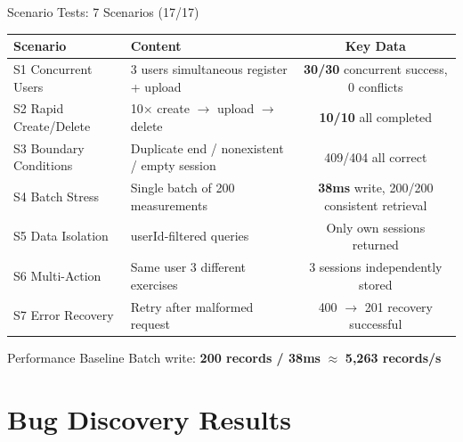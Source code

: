 \documentclass[aspectratio=169,utf8,11pt]{beamer}
\begin{document}
\begin{frame}{Scenario Tests: 7 Scenarios (17/17)}
  \begin{table}[h]
    \centering
    \footnotesize
    \begin{tabular}{llc}
      \toprule
      \textbf{Scenario} & \textbf{Content} & \textbf{Key Data} \\
      \midrule
      S1 Concurrent Users & 3 users simultaneous register + upload & \textbf{30/30} concurrent success, 0 conflicts \\
      S2 Rapid Create/Delete & 10× create $\rightarrow$ upload $\rightarrow$ delete & \textbf{10/10} all completed \\
      S3 Boundary Conditions & Duplicate end / nonexistent / empty session & 409/404 all correct \\
      \rowcolor{blue!8}
      S4 Batch Stress & Single batch of 200 measurements & \textbf{38ms} write, 200/200 consistent retrieval \\
      S5 Data Isolation & userId-filtered queries & Only own sessions returned \\
      S6 Multi-Action & Same user 3 different exercises & 3 sessions independently stored \\
      S7 Error Recovery & Retry after malformed request & 400 $\rightarrow$ 201 recovery successful \\
      \bottomrule
    \end{tabular}
  \end{table}

  \begin{block}{Performance Baseline}
    \centering
    \small Batch write: \textbf{200 records / 38ms} $\approx$ \textbf{5,263 records/s}\\[0.2em]
  \end{block}
\end{frame}

\section{Bug Discovery Results}
\end{document}
